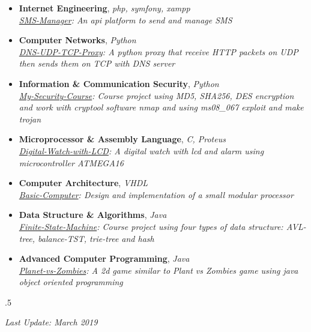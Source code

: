 \documentclass[margin]{res}
\begin{document}
\begin{resume}
\begin{itemize}
\item \textbf{Internet Engineering}, {\sl php, symfony, xampp}\\
\textit{\href{https://github.com/aliyazdi75/sms-manager}{SMS-Manager}: An api platform to send and manage SMS}

\item \textbf{Computer Networks}, {\sl Python}\\
\textit{\href{https://github.com/aliyazdi75/DNS-UDP-TCP-Proxy}{DNS-UDP-TCP-Proxy}: A python proxy that receive HTTP packets on UDP then sends them on TCP with DNS server}

\item \textbf{Information \& Communication Security}, {\sl Python}\\
\textit{\href{https://github.com/aliyazdi75/My-Security-Course}{My-Security-Course}: Course project using MD5, SHA256, DES encryption and work with cryptool software nmap and using ms08\_067 exploit and make trojan}

\item \textbf{Microprocessor \& Assembly Language}, {\sl C, Proteus}\\
\textit{\href{https://github.com/aliyazdi75/Digital-Watch-with-LCD}{Digital-Watch-with-LCD}: A digital watch with lcd and alarm using microcontroller ATMEGA16}


\item \textbf{Computer Architecture}, {\sl VHDL}\\
\textit{\href{https://github.com/aliyazdi75/Basic-Computer-SAYEH-vhdl}{Basic-Computer}: Design and implementation of a small modular processor}

\item \textbf{Data Structure \& Algorithms}, {\sl Java}\\
\textit{\href{https://github.com/aliyazdi75/Finite-State-Machine}{Finite-State-Machine}: Course project using four types of data structure: AVL-tree, balance-TST, trie-tree and hash}

\item \textbf{Advanced Computer Programming}, {\sl Java}\\
\textit{\href{https://github.com/aliyazdi75/Planet\_vs\_Zombies}{Planet-vs-Zombies}: A 2d game similar to Plant vs Zombies game using java object oriented programming}

\end{itemize}

\moveleft.5\hoffset\centerline{\textit{Last Update: March 2019}}

\end{resume}
\end{document}

